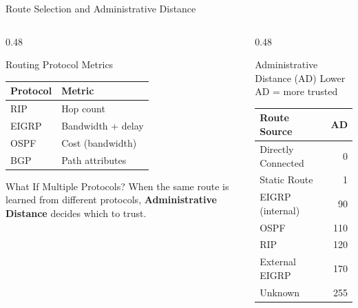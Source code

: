 \documentclass[aspectratio=169]{beamer}  %
\begin{document}
\begin{frame}{Route Selection and Administrative Distance}
    \begin{columns}[T]
        \begin{column}{0.48\textwidth}
            \begin{block}{Routing Protocol Metrics}
                \small
                \begin{tabular}{l l}
                    \toprule
                    \textbf{Protocol} & \textbf{Metric} \\
                    \midrule
                    RIP & Hop count \\
                    EIGRP & Bandwidth + delay \\
                    OSPF & Cost (bandwidth) \\
                    BGP & Path attributes \\
                    \bottomrule
                \end{tabular}
            \end{block}
            
            \vspace{0.3em}
            \begin{alertblock}{What If Multiple Protocols?}
                \small
                When the same route is learned from different protocols, \textbf{Administrative Distance} decides which to trust.
            \end{alertblock}
        \end{column}
        \begin{column}{0.48\textwidth}
            \begin{block}{Administrative Distance (AD)}
                \small
                Lower AD = more trusted
                
                \vspace{0.2em}
                \begin{tabular}{l r}
                    \toprule
                    \textbf{Route Source} & \textbf{AD} \\
                    \midrule
                    Directly Connected & 0 \\
                    Static Route & 1 \\
                    EIGRP (internal) & 90 \\
                    OSPF & 110 \\
                    RIP & 120 \\
                    External EIGRP & 170 \\
                    Unknown & 255 \\
                    \bottomrule
                \end{tabular}
            \end{block}
            

\end{column}
\end{columns}
\end{frame}
\end{document}
